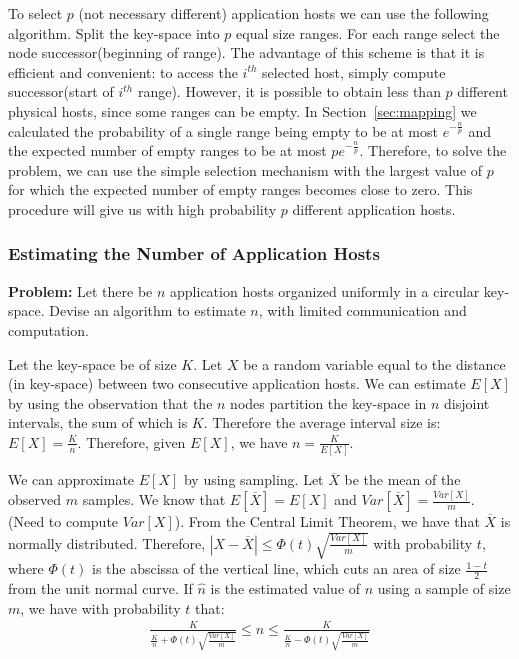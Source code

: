 \documentclass[11pt,twocolumn]{MyTightStyle}
\theoremstyle{plain}
\theoremstyle{definition}
\theoremstyle{remark}
\numberwithin{equation}{section}
\begin{document}
 To select $p$ (not necessary different)
application  hosts we can use the following algorithm. Split the
key-space into $p$ equal size ranges. For each range select the node
successor(beginning of range). The advantage of this scheme is that it
is efficient and convenient: to access the $i^{th}$ selected host, simply
compute successor(start of $i^{th}$ range). However, it is possible to
obtain less than $p$ different physical hosts, since some ranges can
be empty. In Section~\ref{sec:mapping} we calculated the probability
of a single range being empty to be at most $e^{-\frac{n}{p}}$ and
the expected number of empty ranges to be at most
$pe^{-\frac{n}{p}}$. Therefore, to solve the problem, we can use the
simple selection mechanism with the largest value of $p$ for which the
expected number of empty ranges becomes close to zero. This procedure
will give us with high probability $p$ different application hosts.

\subsubsection{Estimating the Number of Application Hosts}
\label{sec:estimating}
{\bf Problem:} Let there be $n$ application hosts organized uniformly in a
circular key-space. Devise an algorithm to estimate $n$, with limited
communication and computation.

 Let the key-space be of size $K$. Let $X$ be
a random variable equal to the distance (in key-space) between two
consecutive application hosts. We can estimate $E[X]$ by using the
observation that the $n$ nodes partition the key-space in $n$ disjoint
intervals, the sum of which is $K$. Therefore the average interval
size is: $E[X] = \frac{K}{n}$. Therefore, given $E[X]$, we have $n =
\frac{K}{E[X]}$.

We can approximate $E[X]$ by using sampling. Let $\overline{X}$ be the
mean of the observed $m$ samples. We know that $E[\overline{X}] = E[X]$
and $Var[\overline{X}] = \frac{Var[X]}{m}$. (Need to compute
$Var[X]$). From the Central Limit Theorem, we have that $\overline{X}$
is normally distributed. Therefore, $|X-\overline{X}| \leq
\Phi(t)\sqrt{\frac{Var[X]}{m}}$ with probability $t$, where $\Phi(t)$
is the abscissa of the vertical line, which cuts an area of size
$\frac{1-t}{2}$ from the unit normal curve. If $\widehat{n}$ is the
estimated value of $n$ using a sample of size $m$, we have with
probability $t$ that:
\begin{eqnarray*}
\frac{K}{\frac{K}{n} + \Phi(t)\sqrt{\frac{Var[X]}{m}}} \leq \widehat{n} \leq
  \frac{K}{\frac{K}{n} - \Phi(t)\sqrt{\frac{Var[X]}{m}} }
\end{eqnarray*}
\end{document}

